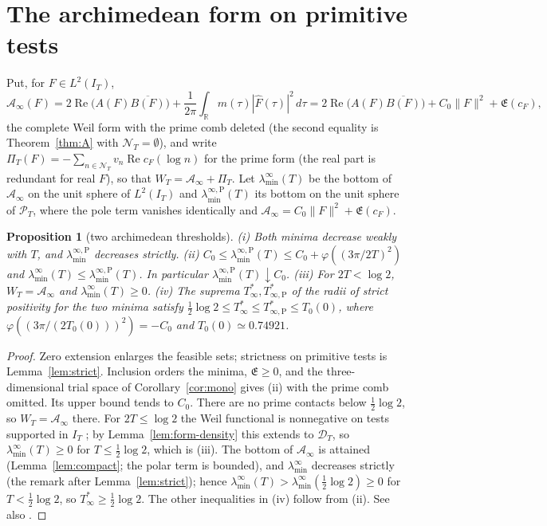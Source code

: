 \documentclass[10pt]{amsart}
\newtheorem{proposition}[theorem]{Proposition}
\theoremstyle{definition}
\theoremstyle{remark}
\newcommand{\R}{\mathbb R}
\newcommand{\Rel}{\operatorname{Re}}
\newcommand{\PT}{\mathcal P_T}
\newcommand{\IT}{I_T}
\newcommand{\Fh}{\widehat F}
\newcommand{\cF}{c_F}
\newcommand{\Lev}{\mathfrak E}
\newcommand{\NT}{\mathcal N_T}
\newcommand{\Ainf}{\mathcal A_\infty}
\newcommand{\PiT}{\Pi_T}
\newcommand{\laminf}{\lambda^{\infty}_{\min}}
\newcommand{\laminfP}{\lambda^{\infty,\mathrm P}_{\min}}
\begin{document}
\section{The archimedean form on primitive tests}\label{sec:archstr}

Put, for $F\in L^2(\IT)$,
\[
\Ainf(F)=2\Rel\big(A(F)\overline{B(F)}\big)+\frac1{2\pi}\int_\R m(\tau)|\Fh(\tau)|^2\,d\tau
=2\Rel\big(A(F)\overline{B(F)}\big)+C_0\|F\|^2+\Lev(\cF),
\]
the complete Weil form with the prime comb deleted (the second equality is Theorem~\ref{thm:A} with
$\NT=\emptyset$), and write $\PiT(F)=-\sum_{n\in\NT}v_n\Rel\cF(\log n)$ for the prime form (the real part is redundant for real $F$), so that
$W_T=\Ainf+\PiT$. Let $\laminf(T)$ be the bottom of $\Ainf$ on the unit sphere of $L^2(\IT)$ and
$\laminfP(T)$ its bottom on the unit sphere of $\PT$, where the pole term vanishes identically and
$\Ainf=C_0\|F\|^2+\Lev(\cF)$.

\begin{proposition}[two archimedean thresholds]\label{prop:arch}
(i) Both minima decrease weakly with $T$, and $\laminfP$ decreases strictly.
(ii) $C_0\le\laminfP(T)\le C_0+\varphi((3\pi/2T)^2)$ and
$\laminf(T)\le\laminfP(T)$. In particular $\laminfP(T)\downarrow C_0$.
(iii) For $2T<\log2$, $W_T=\Ainf$ and $\laminf(T)\ge0$.
(iv) The suprema $T^*_\infty,T^*_{\infty,\mathrm P}$ of the radii of
strict positivity for the two minima satisfy
$\tfrac12\log2\le T^*_\infty\le T^*_{\infty,\mathrm P}\le T_0(0)$,
where $\varphi((3\pi/(2T_0(0)))^2)=-C_0$ and $T_0(0)\simeq0.74921$.
\end{proposition}
\begin{proof}
Zero extension enlarges the feasible sets; strictness on primitive tests
is Lemma~\ref{lem:strict}. Inclusion orders the minima, $\Lev\ge0$,
and the three-dimensional trial space of Corollary~\ref{cor:mono}
gives (ii) with the prime comb omitted. Its upper bound tends to $C_0$.
There are no prime contacts below $\tfrac12\log2$, so $W_T=\Ainf$ there. For $2T\le\log2$ the
Weil functional is nonnegative on tests supported in $\IT$ \cite[Thm.~1, p.~283]{Yoshida1992}; by
Lemma~\ref{lem:form-density} this extends to $\mathcal D_T$, so $\laminf(T)\ge0$ for $T\le\frac12\log2$,
which is (iii). The bottom of $\Ainf$ is attained (Lemma~\ref{lem:compact}; the polar term is bounded),
and $\laminf$ decreases strictly (the remark after Lemma~\ref{lem:strict}); hence
$\laminf(T)>\laminf(\frac12\log2)\ge0$ for $T<\frac12\log2$, so $T^*_\infty\ge\frac12\log2$. The other
inequalities in (iv) follow from (ii).
See also \cite{Bombieri2000,ConnesConsani2021,Zhu2026}.
\end{proof}
\end{document}
